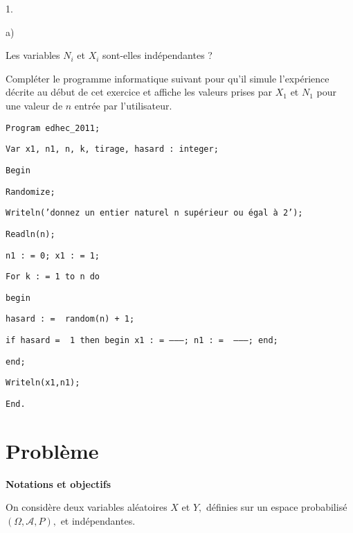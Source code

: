 \documentclass[11pt]{article}%
\begin{document}
\begin{noliste}{1.}
\begin{noliste}{a)}
\item Les variables $N_{i}$ et $X_{i}$ sont-elles indépendantes ?
\end{noliste}

\item Compléter le programme informatique suivant pour qu'il simule
l'expérience décrite au début de cet exercice et affiche les valeurs
prises
par $X_{1}$ et $N_{1}$ pour une valeur de $n$ entrée par l'utilisateur.

\texttt{Program\ edhec\_{2}011;}

\texttt{Var\ x1,\ n1,\ n,\ k,\ tirage,\ hasard\ :\ integer;}

\texttt{Begin}

\texttt{\hspace*{1cm}Randomize;}

\texttt{\hspace*{1cm}Writeln('donnez\ un\ entier\ naturel\ n\
supérieur\ ou\ égal\ à\ 2');}

\texttt{\hspace*{1cm}Readln(n);}

\texttt{\hspace*{1cm}n1 : = 0;\ x1 : = 1;}

\texttt{\hspace*{1cm}For\ k : = 1\ to\ n\ do}

\texttt{\hspace*{1cm}begin}

\texttt{\hspace*{2cm}hasard\ : = \ random(n) + 1;}

\texttt{\hspace*{2cm}if\ hasard\ = \ 1\ then\ begin\ x1\ : = --------;\
n1 : = \ --------;\ end;}

\texttt{\hspace*{1cm}end;}

\texttt{\hspace*{1cm}Writeln(x1,n1);}

\texttt{End.}
\end{noliste}

\section*{Problème}

\textbf{Notations et objectifs}

On considère deux variables aléatoires $X$ et $Y,$ définies sur un
espace
probabilisé $\left( \Omega,\mathcal{A},P\right),$ et indépendantes.
\end{document}
